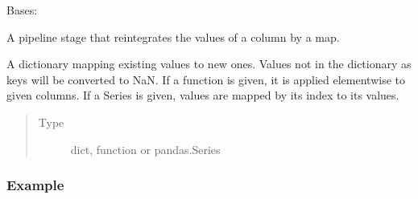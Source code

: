 \documentclass[letterpaper,10pt,english]{sphinxmanual}
\begin{document}

\begin{fulllineitems}
\label{\detokenize{dalio.pipe:dalio.pipe.MapColVals}}
Bases: {\hyperref[\detokenize{dalio.pipe:dalio.pipe.col_generation.Custom}]{}}

A pipeline stage that reintegrates the values of a column by a map.

\begin{fulllineitems}
\label{\detokenize{dalio.pipe:dalio.pipe.MapColVals.value_map}}
A dictionary mapping
existing values to new ones. Values not in the dictionary as keys
will be converted to NaN. If a function is given, it is applied
element\sphinxhyphen{}wise to given columns. If a Series is given, values are
mapped by its index to its values.
\begin{quote}\begin{description}
\item[{Type}] \leavevmode
dict, function or pandas.Series

\end{description}\end{quote}

\end{fulllineitems}

\subsubsection*{Example}


\end{fulllineitems}
\end{document}
